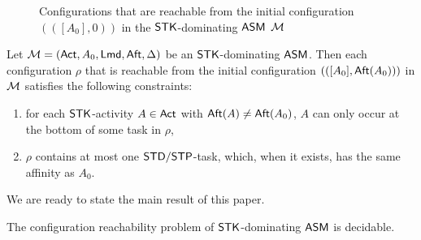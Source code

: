 \begin{example}
\begin{figure}[htbp]
			\caption{Configurations that are reachable from the initial configuration $(([A_0], 0))$ in the $\mathsf{STK}$-dominating $\textsf{ASM}$ ${\mathcal{M} }$}
		\label{stk-asm-example}
	\end{figure}

\end{example}


\begin{proposition}\label{prop-stk}
    Let ${\mathcal{M} }=({\sf Act},A_0,{\sf Lmd},{\sf Aft},\Delta)$ be an $\mathsf{STK}$-dominating $\textsf{ASM}$. Then each configuration $\rho$ that is reachable from the initial configuration $(([A_0],{\sf Aft}(A_0)))$ in ${\mathcal{M} }$ satisfies the following constraints:
    \begin{enumerate}
        \item for each $\mathsf{STK}$-activity $A\in{\sf Act}$ with ${\sf Aft}(A)\neq{\sf Aft}(A_0)$, $A$ can only occur at the bottom of some task in $\rho$, 
        \item $\rho$ contains at most one ${\sf STD}/{\sf STP}$-task, which, when it exists, has the same affinity as $A_0$.
    \end{enumerate}
\end{proposition}

We are ready to state the main result of this paper. 

\begin{theorem}\label{thm:st-amass-reach}
The configuration reachability problem of $\mathsf{STK}$-dominating $\textsf{ASM}$ is decidable.
\end{theorem}

